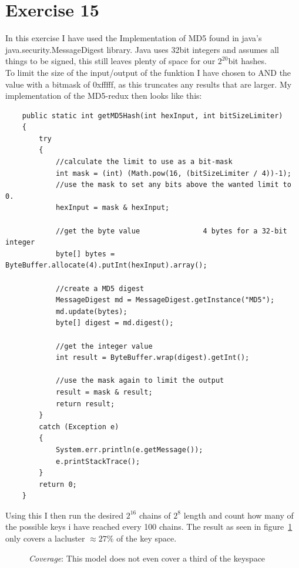 \section*{Exercise 15}
In this exercise I have used the Implementation of MD5 found in java's
java.security.MessageDigest library. Java uses 32bit integers and assumes all
things to be signed, this still leaves plenty of space for our $2^{20}$bit
hashes.\\
To limit the size of the input/output of the funktion I have chosen to AND the
value with a bitmask of 0xfffff, as this truncates any results that are larger.
My implementation of the MD5-redux then looks like this:\\
\begin{lstlisting}
	public static int getMD5Hash(int hexInput, int bitSizeLimiter)
	{
		try
		{
			//calculate the limit to use as a bit-mask
			int mask = (int) (Math.pow(16, (bitSizeLimiter / 4))-1);
			//use the mask to set any bits above the wanted limit to 0.
			hexInput = mask & hexInput;
			
			//get the byte value 			   4 bytes for a 32-bit integer
			byte[] bytes = ByteBuffer.allocate(4).putInt(hexInput).array();
			
			//create a MD5 digest
			MessageDigest md = MessageDigest.getInstance("MD5");
			md.update(bytes);
			byte[] digest = md.digest();

			//get the integer value
			int result = ByteBuffer.wrap(digest).getInt();
			
			//use the mask again to limit the output
			result = mask & result;
			return result;
		}
		catch (Exception e)
		{
			System.err.println(e.getMessage());
			e.printStackTrace();
		}
		return 0;
	}
\end{lstlisting}
Using this I then run the desired $2^{16}$ chains of $2^{8}$ length and count
how many of the possible keys i have reached every 100 chains. The result as
seen in figure~\ref{fig:Hellman} only covers a lacluster $\approx
27\%$ of the key space.
\FloatBarrier
\begin{figure}[h]
\centering
{}
\caption{\emph{Coverage}: This model does not even cover a third of the
keyspace}
\label{fig:Hellman}
\end{figure}
\FloatBarrier